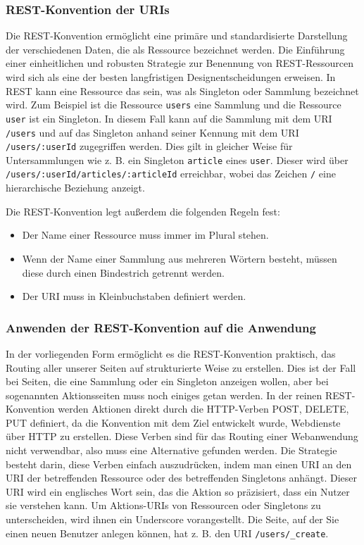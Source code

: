 \subsubsection{REST-Konvention der URIs}

Die REST-Konvention ermöglicht eine primäre und standardisierte Darstellung der verschiedenen Daten, die als Ressource bezeichnet werden.
Die Einführung einer einheitlichen und robusten Strategie zur Benennung von REST-Ressourcen wird sich als eine der besten langfristigen Designentscheidungen erweisen.
In REST kann eine Ressource das sein, was als Singleton oder Sammlung bezeichnet wird.
Zum Beispiel ist die Ressource \lstinline{users} eine Sammlung und die Ressource \lstinline{user} ist ein Singleton.
In diesem Fall kann auf die Sammlung mit dem \ac{URI} \lstinline{/users} und auf das Singleton anhand seiner Kennung mit dem \ac{URI} \lstinline{/users/:userId} zugegriffen werden.
Dies gilt in gleicher Weise für Untersammlungen wie z. B. ein Singleton \lstinline{article} eines \lstinline{user}.
Dieser wird über \lstinline{/users/:userId/articles/:articleId} erreichbar, wobei das Zeichen \lstinline{/} eine hierarchische Beziehung anzeigt.

Die REST-Konvention legt außerdem die folgenden Regeln fest:

\begin{itemize}
  \item Der Name einer Ressource muss immer im Plural stehen.
  \item Wenn der Name einer Sammlung aus mehreren Wörtern besteht, müssen diese durch einen Bindestrich getrennt werden.
  \item Der \ac{URI} muss in Kleinbuchstaben definiert werden.
\end{itemize}

\subsubsection{Anwenden der REST-Konvention auf die Anwendung} \label{sec:rest_custom}

In der vorliegenden Form ermöglicht es die REST-Konvention praktisch, das Routing aller unserer Seiten auf strukturierte Weise zu erstellen.
Dies ist der Fall bei Seiten, die eine Sammlung oder ein Singleton anzeigen wollen, aber bei sogenannten Aktionsseiten muss noch einiges getan werden.
In der reinen REST-Konvention werden Aktionen direkt durch die \ac{HTTP}-Verben POST, DELETE, PUT definiert, da die Konvention mit dem Ziel entwickelt wurde, Webdienste über \ac{HTTP} zu erstellen.
Diese Verben sind für das Routing einer Webanwendung nicht verwendbar, also muss eine Alternative gefunden werden.
Die Strategie besteht darin, diese Verben einfach auszudrücken, indem man einen URI an den URI der betreffenden Ressource oder des betreffenden Singletons anhängt.
Dieser \ac{URI} wird ein englisches Wort sein, das die Aktion so präzisiert, dass ein Nutzer sie verstehen kann.
Um Aktions-\ac{URI}s von Ressourcen oder Singletons zu unterscheiden, wird ihnen ein Underscore vorangestellt.
Die Seite, auf der Sie einen neuen Benutzer anlegen können, hat z. B. den \ac{URI} \lstinline{/users/_create}.

